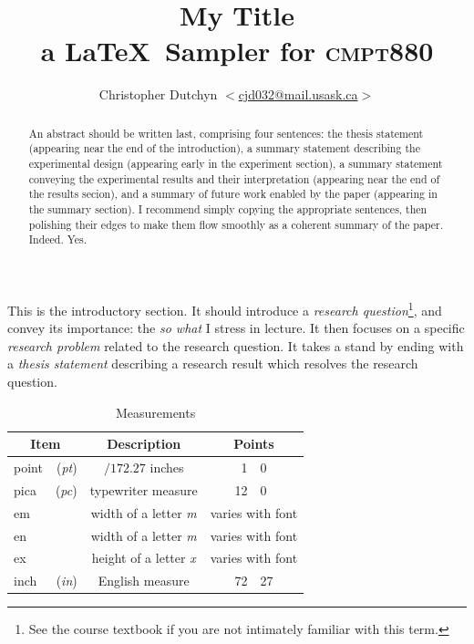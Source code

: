 \documentclass{article}
\newcommand*{\term}[1]{\textit{#1}}
\newcommand*{\tblhead}[1]{\textbf{#1}}
\begin{document}
\title{My Title
  \\ \large{a \LaTeX\ Sampler for \textsc{cmpt}880}}
\author{Christopher Dutchyn $<$\href{mailto:cjd032@mail.usask.ca}
                                    {\url{cjd032@mail.usask.ca}$>$}}
\maketitle

\begin{abstract}
  An abstract should be written last, comprising four sentences: the thesis statement (appearing near the end of the introduction), a summary statement describing the experimental design (appearing early in the experiment section), a summary statement conveying the experimental results and their interpretation (appearing near the end of the results secion), and a summary of future work enabled by the paper (appearing in the summary section).  I recommend simply copying the appropriate sentences, then polishing their edges to make them flow smoothly as a coherent summary of the paper. Indeed. Yes.
\end{abstract}

This is the introductory section.  It should introduce a \emph{research question}\footnote{See the course textbook\citep{text} if you are not intimately familiar with this term.}, and convey its importance: the \emph{so what} I stress in lecture.  It then focuses on a specific \emph{research problem} related to the research question.  It takes a stand by ending with a \emph{thesis statement} describing a research result which resolves the research question.

\begin{table}[!h]
\caption{Measurements}\label{numtab}
\begin{center}
\begin{tabular}{l r c r@{.}l}
  \toprule
  \multicolumn{2}{c}{\tblhead{Item}}
                 & \tblhead{Description}
                 & \multicolumn{2}{c}{\tblhead{Points}}\\
  \midrule
  point & (\term{pt}) & $/{1}{72.27}$ inches & 1 & 0 \\
  pica  & (\term{pc}) & typewriter measure & 12 & 0 \\
  em    &             & width of a letter \term{m} & \multicolumn{2}{c}{varies with font} \\
  en    &             & width of a letter \term{m} & \multicolumn{2}{c}{varies with font} \\
  ex    &             & height of a letter \term{x} & \multicolumn{2}{c}{varies with font} \\
  inch  & (\term{in}) & English measure & 72 & 27 \\
  \bottomrule
\end{tabular}
\end{center}
\end{table}
\end{document}
